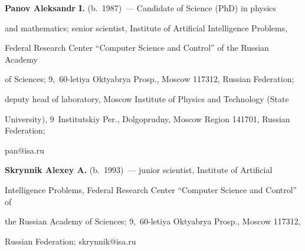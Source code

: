   \vspace*{3pt}


  


  \noindent


  \textbf{Panov Aleksandr I.} (b.\ 1987)~--- Candidate of Science (PhD) in physics 


and mathematics; senior scientist, Institute of Artificial Intelligence Problems, 


Federal Research Center ``Computer Science and Control'' of the Russian Academy 


of Sciences; 9,~60-letiya Oktyabrya Prosp., Moscow 117312, Russian Federation; 


deputy head of laboratory, Moscow Institute of Physics and Technology (State 


University), 9~Institutskiy Per., Dolgoprudny, Moscow Region 141701, Russian Federation; 


\mbox{pan@isa.ru}


  


  \vspace*{3pt}


  


  \noindent


  \textbf{Skrynnik Alexey A.} (b.\ 1993)~--- junior scientist, Institute of Artificial 


Intelligence Problems, Federal Research Center ``Computer Science and Control'' of 


the Russian Academy of Sciences; 9,~60-letiya Oktyabrya Prosp., Moscow 117312, 


Russian Federation; \mbox{skrynnik@isa.ru}


  


  \vspace*{3pt}


  


  










